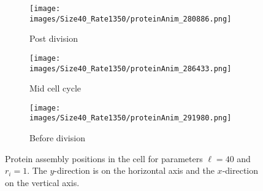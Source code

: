 \begin{figure}[htbp]
    \centering
    \begin{subfigure}[b]{\textwidth}
        \centering
        \texttt{[image: images/Size40\_Rate1350/proteinAnim\_280886.png]}
        \caption{Post division}
        \label{subfig:40_1350_post}
    \end{subfigure}
    \vfill
    \begin{subfigure}[b]{\textwidth}
        \centering
        \texttt{[image: images/Size40\_Rate1350/proteinAnim\_286433.png]}
        \caption{Mid cell cycle}
        \label{subfig:40_1350_mid}
    \end{subfigure}
    \vfill
    \begin{subfigure}[b]{\textwidth}
        \centering
        \texttt{[image: images/Size40\_Rate1350/proteinAnim\_291980.png]}
        \caption{Before division}
        \label{subfig:40_1350_pre}
    \end{subfigure}
    \caption{
    Protein assembly positions in the cell for parameters $\ell=40$ and $r_i=1$. The $y$-direction is on the horizontal axis and the $x$-direction on the vertical axis.
    }
    \label{fig:40_1350_cellcycle}
\end{figure}
